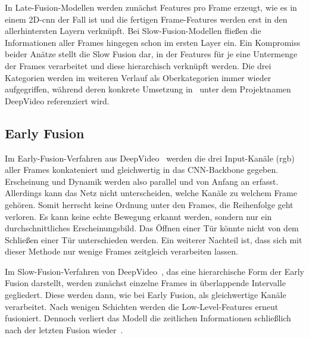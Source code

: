 In Late-Fusion-Modellen werden zunächst Features pro Frame erzeugt, wie es in einem 2D-\gls{cnn} der Fall ist und die fertigen Frame-Features werden erst in den allerhintersten Layern verknüpft.
Bei Slow-Fusion-Modellen fließen die Informationen aller Frames hingegen schon im ersten Layer ein.
Ein Kompromiss beider Anätze stellt die Slow Fusion dar, in der Features für je eine Untermenge der Frames verarbeitet und diese hierarchisch verknüpft werden.
Die drei Kategorien werden im weiteren Verlauf als Oberkategorien immer wieder aufgegriffen, während deren konkrete Umsetzung in~\cite{Karpathy14} unter dem Projektnamen DeepVideo referenziert wird.



\subsection{Early Fusion}
\label{subsec:early-fusion}

Im Early-Fusion-Verfahren aus DeepVideo~\cite{Karpathy14} werden die drei Input-Kanäle (\gls{rgb}) aller Frames konkateniert und gleichwertig in das CNN-Backbone gegeben.
Erscheinung und Dynamik werden also parallel und von Anfang an erfasst.
Allerdings kann das Netz nicht unterscheiden, welche Kanäle zu welchem Frame gehören.
Somit herrscht keine Ordnung unter den Frames, \dh die Reihenfolge geht verloren.
Es kann keine echte Bewegung erkannt werden, sondern nur ein durchschnittliches Erscheinungsbild.
Das Öffnen einer Tür könnte \zB nicht von dem Schließen einer Tür unterschieden werden.
Ein weiterer Nachteil ist, dass sich mit dieser Methode nur wenige Frames zeitgleich verarbeiten lassen.

Im Slow-Fusion-Verfahren von DeepVideo~\cite{Karpathy14}, das eine hierarchische Form der Early Fusion darstellt, werden zunächst einzelne Frames in überlappende Intervalle gegliedert.
Diese werden dann, wie bei Early Fusion, als gleichwertige Kanäle verarbeitet.
Nach wenigen Schichten werden die Low-Level-Features erneut fusioniert.
Dennoch verliert das Modell die zeitlichen Informationen schließlich nach der letzten Fusion wieder~\cite{Tran15}.

